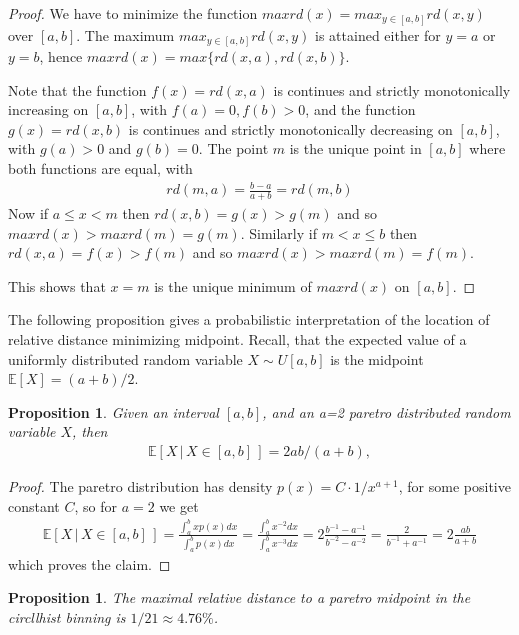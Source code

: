 \documentclass{article}
\theoremstyle{plain}
\newtheorem{proposition}[definition]{Proposition}
\theoremstyle{remark}
\newcommand{\IE}{\mathbb{E}}
\begin{document}
\begin{proof}
  We have to minimize the function $maxrd(x) = max_{y\in[a,b]} rd(x, y)$ over $[a,b]$.
  The maximum $max_{y\in[a,b]} rd(x, y)$ is attained either for $y = a$ or $y = b$,
  hence $maxrd(x) = max\{ rd(x,a), rd(x,b) \}$.

  Note that the function $f(x) = rd(x, a)$ is continues and strictly monotonically increasing on $[a,b]$, with $f(a) = 0, f(b) > 0$,
  and the function $g(x) = rd(x, b)$ is continues and strictly monotonically decreasing on $[a,b]$, with $g(a) > 0$ and $g(b) = 0$.
  The point $m$ is the unique point in $[a,b]$ where both functions are equal, with
  \begin{align*}
    rd(m, a) = \frac{b - a}{a + b} = rd(m, b)
  \end{align*}
  Now if $a \leq x < m$ then $rd(x, b) = g(x) > g(m)$ and so $maxrd(x) > maxrd(m) = g(m)$.
  Similarly if $m < x \leq b$ then $rd(x, a) = f(x) > f(m)$ and so $maxrd(x) > maxrd(m) = f(m)$.

  This shows that $x=m$ is the unique minimum of $maxrd(x)$ on $[a,b]$.
\end{proof}

The following proposition gives a probabilistic interpretation of the location of relative distance minimizing midpoint.
Recall, that the expected value of a uniformly distributed random variable $X \sim U[a,b]$ is the midpoint $\IE[X] = (a+b)/2$.

\begin{proposition}
  Given an interval $[a,b]$, and an a=2 paretro distributed random variable $X$, then
  \begin{align*}
    \IE[ X \, | \, X \in [a,b] \,] = 2ab / (a + b),
  \end{align*}
\end{proposition}

\begin{proof}
  The paretro distribution has density $p(x) =C \cdot 1/x^{a+1}$, for some positive constant $C$, so for $a=2$ we get
  \begin{align*}
    \IE[ X \, | \, X \in [a,b] \,] = \frac{\int_a^b x p(x) dx}{\int_a^b p(x) dx}
    = \frac{\int_a^b x^{-2}  dx}{\int_a^b x^{-3} dx} = 2 \frac{b^{-1} - a^{-1}}{b^{-2}- a^{-2}}
    = \frac{2}{b^{-1} + a^{-1}}
    = 2 \frac{ab}{a + b}
  \end{align*}
  which proves the claim.
\end{proof}

\begin{proposition}\label{prop:21}
  The maximal relative distance to a paretro midpoint in the circllhist binning is $1/21 \approx 4.76\%$.
\end{proposition}
\end{document}

